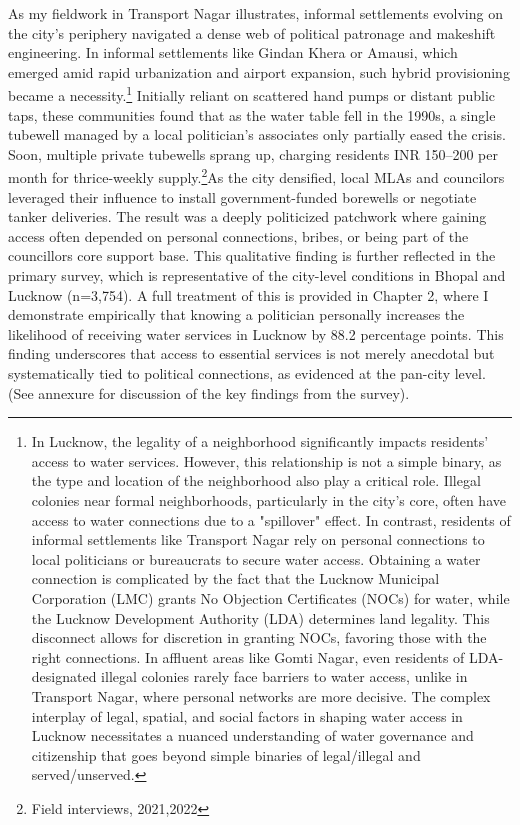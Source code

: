 As my fieldwork in Transport Nagar illustrates, informal settlements evolving on the city’s periphery navigated a dense web of political patronage and makeshift engineering. In informal settlements like Gindan Khera or Amausi, which emerged amid rapid urbanization and airport expansion, such hybrid provisioning became a necessity.\footnote{In Lucknow, the legality of a neighborhood significantly impacts residents' access to water services. However, this relationship is not a simple binary, as the type and location of the neighborhood also play a critical role. Illegal colonies near formal neighborhoods, particularly in the city's core, often have access to water connections due to a "spillover" effect. In contrast, residents of informal settlements like Transport Nagar rely on personal connections to local politicians or bureaucrats to secure water access. Obtaining a water connection is complicated by the fact that the Lucknow Municipal Corporation (LMC) grants No Objection Certificates (NOCs) for water, while the Lucknow Development Authority (LDA) determines land legality. This disconnect allows for discretion in granting NOCs, favoring those with the right connections. In affluent areas like Gomti Nagar, even residents of LDA-designated illegal colonies rarely face barriers to water access, unlike in Transport Nagar, where personal networks are more decisive. The complex interplay of legal, spatial, and social factors in shaping water access in Lucknow necessitates a nuanced understanding of water governance and citizenship that goes beyond simple binaries of legal/illegal and served/unserved.} Initially reliant on scattered hand pumps or distant public taps, these communities found that as the water table fell in the 1990s, a single tubewell managed by a local politician’s associates only partially eased the crisis. Soon, multiple private tubewells sprang up, charging residents INR 150–200 per month for thrice-weekly supply.\footnote{Field interviews, 2021,2022 }As the city densified, local MLAs and councilors leveraged their influence to install government-funded borewells or negotiate tanker deliveries. The result was a deeply politicized patchwork where gaining access often depended on personal connections, bribes, or being part of the councillors core support base. This qualitative finding is further reflected in the primary survey, which is representative of the city-level conditions in Bhopal and Lucknow (n=3,754). A full treatment of this is provided in Chapter 2, where I demonstrate empirically that knowing a politician personally increases the likelihood of receiving water services in Lucknow by 88.2 percentage points. This finding underscores that access to essential services is not merely anecdotal but systematically tied to political connections, as evidenced at the pan-city level. (See annexure for discussion of the key findings from the survey).

